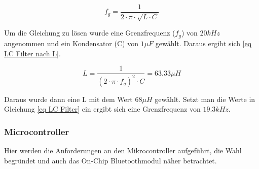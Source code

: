 \begin{equation}
f_g = \frac{1}{2\cdot \pi \cdot \sqrt{L\cdot C}}
\label{eq LC Filter}
\end{equation}

Um die Gleichung zu lösen wurde eine Grenzfrequenz ($f_g$) von $20kHz$ angenommen und ein Kondensator (C) von $1\mu F$ gewählt. Daraus ergibt sich \autoref{eq LC Filter nach L}. 


\begin{equation}
L = \frac{1}{(2\cdot \pi \cdot f_g)^2\cdot C } = 63.33\mu H
\label{eq LC Filter nach L}
\end{equation}

Daraus wurde dann eine L mit dem Wert $68\mu H$ gewählt. Setzt man die Werte in Gleichung \ref{eq LC Filter} ein ergibt sich eine Grenzfrequenz von $19.3kHz$. 


\subsubsection{Microcontroller}
Hier werden die Anforderungen an den Mikrocontroller aufgeführt, die Wahl begründet und auch das On-Chip Bluetoothmodul näher betrachtet.
